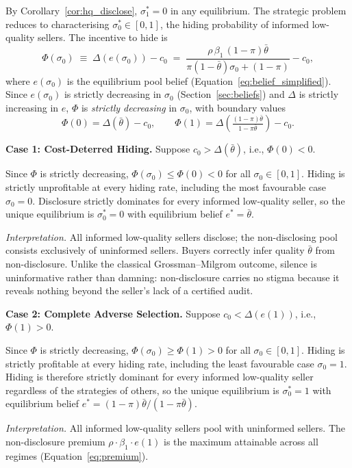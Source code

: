 By Corollary~\ref{cor:hq_disclose}, $\sigma_1^* = 0$ in any equilibrium. The strategic problem reduces to characterising $\sigma_0^* \in [0,1]$, the hiding probability of informed low-quality sellers. The incentive to hide is
\[
    \Phi(\sigma_0) \;\equiv\; \Delta\!\left(e(\sigma_0)\right) - c_0
    \;=\; \frac{\rho\,\beta_1\,(1-\pi)\bar{\theta}}{\pi(1-\bar{\theta})\sigma_0 + (1-\pi)} - c_0,
\]
where $e(\sigma_0)$ is the equilibrium pool belief (Equation~\eqref{eq:belief_simplified}). Since $e(\sigma_0)$ is strictly decreasing in $\sigma_0$ (Section~\ref{sec:beliefs}) and $\Delta$ is strictly increasing in $e$, $\Phi$ is \emph{strictly decreasing} in $\sigma_0$, with boundary values
\[
    \Phi(0) = \Delta(\bar{\theta}) - c_0, \qquad
    \Phi(1) = \Delta\!\left(\tfrac{(1-\pi)\bar{\theta}}{1-\pi\bar{\theta}}\right) - c_0.
\]

\medskip
\textbf{Case 1: Cost-Deterred Hiding.} Suppose $c_0 > \Delta(\bar{\theta})$, i.e., $\Phi(0) < 0$.

Since $\Phi$ is strictly decreasing, $\Phi(\sigma_0) \leq \Phi(0) < 0$ for all $\sigma_0 \in [0,1]$. Hiding is strictly unprofitable at every hiding rate, including the most favourable case $\sigma_0 = 0$. Disclosure strictly dominates for every informed low-quality seller, so the unique equilibrium is $\sigma_0^* = 0$ with equilibrium belief $e^* = \bar{\theta}$.

\textit{Interpretation.} All informed low-quality sellers disclose; the non-disclosing pool consists exclusively of uninformed sellers. Buyers correctly infer quality $\bar{\theta}$ from non-disclosure. Unlike the classical Grossman--Milgrom outcome, silence is uninformative rather than damning: non-disclosure carries no stigma because it reveals nothing beyond the seller's lack of a certified audit.

\medskip
\textbf{Case 2: Complete Adverse Selection.} Suppose $c_0 < \Delta(e(1))$, i.e., $\Phi(1) > 0$.

Since $\Phi$ is strictly decreasing, $\Phi(\sigma_0) \geq \Phi(1) > 0$ for all $\sigma_0 \in [0,1]$. Hiding is strictly profitable at every hiding rate, including the least favourable case $\sigma_0 = 1$. Hiding is therefore strictly dominant for every informed low-quality seller regardless of the strategies of others, so the unique equilibrium is $\sigma_0^* = 1$ with equilibrium belief $e^* = (1-\pi)\bar{\theta}/(1-\pi\bar{\theta})$.

\textit{Interpretation.} All informed low-quality sellers pool with uninformed sellers. The non-disclosure premium $\rho\cdot\beta_1\cdot e(1)$ is the maximum attainable across all regimes (Equation~\eqref{eq:premium}).

